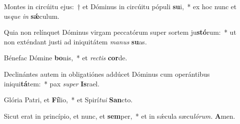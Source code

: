 \item Montes in circúitu ejus:~† et Dóminus in circúitu pópuli \textbf{su}i,~* ex hoc nunc et us\hspace{0.03em}\textit{que} \textit{in} \textbf{sǽ}culum.
\item Quia non relínquet Dóminus virgam peccatórum super sortem ju\textbf{stó}rum:~* ut non exténdant justi ad iniquitátem \textit{manus} \textbf{su}as.
\item Bénefac Dómine \textbf{bo}nis,~* et \textit{rectis} \textbf{cor}de.
\item Declinántes autem in obligatiónes addúcet Dóminus cum operántibus iniqui\textbf{tá}tem:~* pax \textit{super} \textbf{Is}rael.
\item Glória Patri, et \textbf{Fí}lio,~* et Spirí\hspace{0.03em}\textit{tui} \textbf{San}cto.
\item Sicut erat in princípio, et nunc, et \textbf{sem}per,~* et in sǽcula sæcu\hspace{0.03em}\textit{lórum.} \textbf{A}men.

